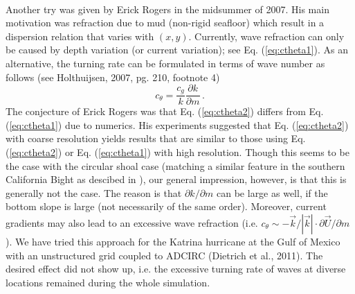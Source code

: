\documentclass[12pt]{book}
\begin{document}
\\[2ex]
Another try was given by Erick Rogers in the midsummer of 2007. His main motivation was refraction due to mud (non-rigid seafloor) which result in a dispersion relation that varies with $(x,y)$.
Currently, wave refraction can only be caused by depth variation (or current variation); see Eq. (\ref{eq:ctheta1}). As an alternative, the turning rate can be formulated in terms of wave
number as follows (see Holthuijsen, 2007, pg. 210, footnote 4)
\begin{equation}
    c_\theta = \frac{c_g}{k} \frac{\partial k}{\partial m}\, .
  \label{eq:ctheta2}
\end{equation}
The conjecture of Erick Rogers was that Eq. (\ref{eq:ctheta2}) differs from Eq. (\ref{eq:ctheta1}) due to numerics. His experiments suggested that Eq. (\ref{eq:ctheta2})
with coarse resolution yields results that are similar to those using Eq. (\ref{eq:ctheta2}) or Eq. (\ref{eq:ctheta1}) with high resolution. Though this seems to be the case with the
circular shoal case (matching a similar feature in the southern California Bight as descibed in \cite{Rog07KHJDH}), our general impression, however, is that this is generally not the case. The reason is that $\partial k/\partial m$ can be large as well,
if the bottom slope is large (not necessarily of the same order). Moreover, current gradients may also lead to an excessive wave refraction (i.e.
$c_\theta \sim -\vec{k}/|\vec{k}| \cdot \partial \vec{U}/\partial m$).
We have tried this approach for the Katrina hurricane at the Gulf of Mexico with an unstructured grid coupled to ADCIRC (Dietrich et al., 2011). The desired effect did not
show up, i.e. the excessive turning rate of waves at diverse locations remained during the whole simulation.

 \label{ch:bc}
\end{document}
